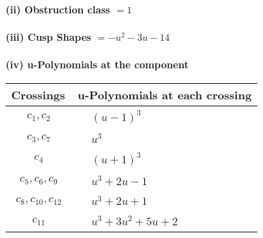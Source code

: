 \documentclass[1p]{elsarticle_modified}
\theoremstyle{definition}
\begin{document}
\flushleft \textbf{(ii) Obstruction class $= 1$}\\~\\
\flushleft \textbf{(iii) Cusp Shapes $= - u^2-3 u-14$}\\~\\
\newpage\renewcommand{\arraystretch}{1}
\flushleft \textbf{(iv) u-Polynomials at the component}\newline \\
\begin{tabular}{m{50pt}|m{274pt}}
Crossings & \hspace{64pt}u-Polynomials at each crossing \\
\hline $$\begin{aligned}c_{1},c_{2}\end{aligned}$$&$\begin{aligned}
&(u-1)^3
\end{aligned}$\\
\hline $$\begin{aligned}c_{3},c_{7}\end{aligned}$$&$\begin{aligned}
&u^3
\end{aligned}$\\
\hline $$\begin{aligned}c_{4}\end{aligned}$$&$\begin{aligned}
&(u+1)^3
\end{aligned}$\\
\hline $$\begin{aligned}c_{5},c_{6},c_{9}\end{aligned}$$&$\begin{aligned}
&u^3+2 u-1
\end{aligned}$\\
\hline $$\begin{aligned}c_{8},c_{10},c_{12}\end{aligned}$$&$\begin{aligned}
&u^3+2 u+1
\end{aligned}$\\
\hline $$\begin{aligned}c_{11}\end{aligned}$$&$\begin{aligned}
&u^3+3 u^2+5 u+2
\end{aligned}$\\
\hline
\end{tabular}\\~\\
\newpage\renewcommand{\arraystretch}{1}
\end{document}
